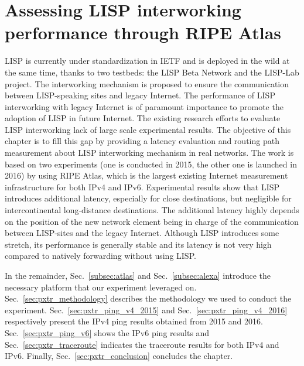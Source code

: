 
\chapter{Assessing LISP interworking performance through RIPE Atlas}
\label{cha:pxtr}
\ifpdf
    \graphicspath{{Chapter6/Pics/Raster/}{Chapter6/Pics/PDF/}{Chapter6/}}
\else
    \graphicspath{{Chapter6/Pics/Vector/}{Chapter6/}}
\fi

LISP is currently under standardization in IETF and is deployed in the wild at the same time, thanks to two testbeds: the LISP Beta Network and the LISP-Lab project. The interworking mechanism is proposed to ensure the communication between LISP-speaking sites and legacy Internet. The performance of LISP interworking with legacy Internet is of paramount importance to promote the adoption of LISP in future Internet. The existing research efforts to evaluate LISP interworking lack of large scale experimental results. The objective of this chapter is to fill this gap by providing a latency evaluation and routing path measurement about LISP interworking mechanism in real networks. The work is based on two experiments (one is conducted in 2015, the other one is launched in 2016) by using RIPE Atlas, which is the largest existing Internet measurement infrastructure for both IPv4 and IPv6. Experimental results show that LISP introduces additional latency, especially for close destinations, but negligible for intercontinental long-distance destinations. The additional latency highly depends on the position of the new network element being in charge of the communication between LISP-sites and the legacy Internet. Although LISP introduces some stretch, its performance is generally stable and its latency is not very high compared to natively forwarding without using LISP.

In the remainder, Sec.~\ref{subsec:atlas} and Sec.~\ref{subsec:alexa} introduce the necessary platform that our experiment leveraged on. Sec.~\ref{sec:pxtr_methodology} describes the methodology we used to conduct the experiment. Sec.~\ref{sec:pxtr_ping_v4_2015} and Sec.~\ref{sec:pxtr_ping_v4_2016} respectively present the IPv4 ping results obtained from 2015 and 2016. Sec.~\ref{sec:pxtr_ping_v6} shows the IPv6 ping results and Sec.~\ref{sec:pxtr_traceroute} indicates the traceroute results for both IPv4 and IPv6. Finally, Sec.~\ref{sec:pxtr_conclusion} concludes the chapter. 

